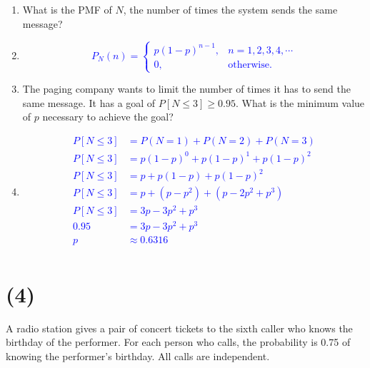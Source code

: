\documentclass[12pt]{article}
\begin{document}
\begin{enumerate}
    \item[(a)] What is the PMF of $N$, the number of times the system sends the same message?
    \item[] \textcolor{blue}{\[
P_N(n) =
\begin{cases}
p(1-p)^{n-1}, & n = 1,2,3,4,\cdots \\
0, & \text{otherwise}.
\end{cases}
\]}
    \item[(b)] The paging company wants to limit the number of times it has to send the same
    message. It has a goal of $P[N \leq 3] \geq 0.95$. What is the minimum value of $p$ necessary to achieve the goal?
    \item[] 
\textcolor{blue}{
\[
\begin{aligned}
P[N \leq 3] &= P(N = 1) + P(N = 2) + P(N = 3) \\
P[N \leq 3] &= p(1 - p)^{0} + p(1 - p)^{1} + p(1 - p)^{2} \\
P[N \leq 3] &= p + p(1 - p) + p(1 - p)^2 \\
P[N \leq 3] &= p + (p - p^2) + (p - 2p^2 + p^3) \\
P[N \leq 3] &= 3p - 3p^2 + p^3 \\
0.95 &= 3p - 3p^2 + p^3 \\
p &\approx 0.6316 \\
\end{aligned}
\]
}
\end{enumerate}
\newpage
    
\section*{(4)}
 A radio station gives a pair of concert tickets to the sixth caller who knows the
birthday of the performer. For each person who calls, the probability is 0.75 of knowing
the performer’s birthday. All calls are independent.
\end{document}
